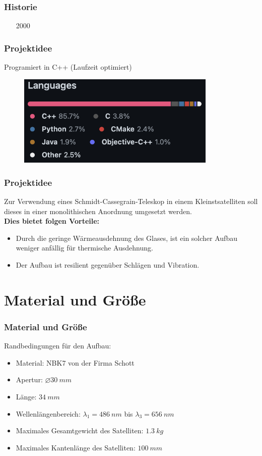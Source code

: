 \documentclass{beamer}
\begin{document}
\begin{frame} \frametitle{Historie}
	\begin{itemize}
		\item [2000]
	
	\end{itemize}
	\cite{GitHub}
\end{frame}

\begin{frame} \frametitle{Projektidee}
	Programiert in C++ (Laufzeit optimiert)
	\begin{figure}
		\centering
		\includegraphics[width=0.85\textwidth]{Bilder/CodeBase.png}
		\label{a4}
	\end{figure}
\end{frame}

\begin{frame} \frametitle{Projektidee}
	Zur Verwendung eines Schmidt-Cassegrain-Teleskop in  einem Kleinstsatelliten soll dieses in einer monolithischen Anordnung umgesetzt werden.\\
	\textbf{Dies bietet folgen Vorteile:}\\
	\begin{itemize}
		\item  Durch die geringe  Wärmeausdehnung des Glases, ist ein solcher Aufbau weniger anfällig für thermische Ausdehnung. \pause
		\item Der Aufbau ist resilient gegenüber  Schlägen und Vibration.
	\end{itemize}
\end{frame}

\section{Material und Größe}
\begin{frame}
	\frametitle{Material und Größe}
	Randbedingungen für den Aufbau:
		\begin{itemize}
		\item  Material: NBK7 von der Firma Schott \pause
		\item Apertur: $\varnothing 30 ~mm$ \pause
		\item Länge: $ 34 ~mm$ \pause
		\item Wellenlängenbereich: $\lambda_1 = 486~nm $ bis $ \lambda_3=656 ~nm$ \pause
		\item Maximales Gesamtgewicht des  Satelliten: $ 1.3 ~kg$ \pause
		\item Maximales Kantenlänge des  Satelliten: $ 100 ~mm$ 
	\end{itemize}
\end{frame}
\end{document}
